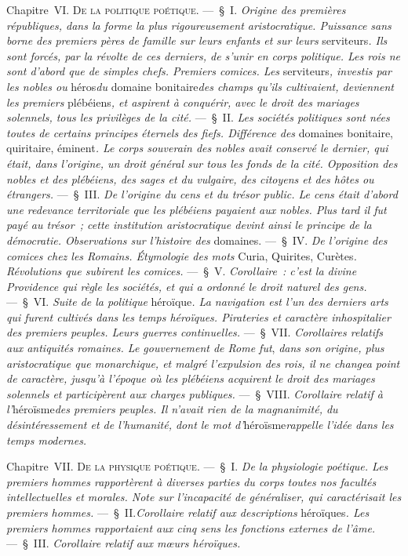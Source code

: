 \documentclass[french,twoside]{book} %
\begin{document}
Chapitre {\scshape VI. De la politique poétique.} — § I. {\itshape Origine des premières républiques, dans la forme la plus rigoureusement aristocratique. Puissance sans borne des premiers pères de famille sur leurs enfants et sur leurs} serviteurs{\itshape . Ils sont forcés, par la révolte de ces derniers, de s’unir en corps}  {\itshape politique. Les rois ne sont d’abord que de simples chefs. Premiers comices. Les} serviteurs{\itshape , investis par les nobles ou} héros{\itshape  du} domaine bonitaire{\itshape  des champs qu’ils cultivaient, deviennent les premiers} plébéiens{\itshape , et aspirent à conquérir, avec le droit des mariages solennels, tous les privilèges de la cité.} — § II. {\itshape Les sociétés politiques sont nées toutes de certains principes éternels des fiefs. Différence des} domaines bonitaire, quiritaire, éminent{\itshape . Le corps souverain des nobles avait conservé le dernier, qui était, dans l’origine, un droit général sur tous les fonds de la cité. Opposition des nobles et des plébéiens, des sages et du vulgaire, des citoyens et des hôtes ou étrangers.} — § III. {\itshape De l’origine du cens et du trésor public. Le cens était d’abord une redevance territoriale que les plébéiens payaient aux nobles. Plus tard il fut payé au trésor ; cette institution aristocratique devint ainsi le principe de la démocratie. Observations sur l’histoire des} domaines. — § IV. {\itshape De l’origine des comices chez les Romains. Étymologie des mots} Curia, Quirites, Curètes{\itshape . Révolutions que subirent les comices.} — § V. {\itshape Corollaire : c’est la divine Providence qui règle les sociétés, et qui a ordonné le droit naturel des gens.} — § VI. {\itshape Suite de la politique} héroïque{\itshape . La navigation est l’un des derniers arts qui furent cultivés dans les temps héroïques. Pirateries et caractère inhospitalier des premiers peuples. Leurs guerres continuelles.} — § VII. {\itshape Corollaires relatifs aux antiquités romaines. Le gouvernement de Rome fut},  {\itshape dans son origine, plus aristocratique que monarchique, et malgré l’expulsion des rois, il ne changea point de caractère, jusqu’à l’époque où les plébéiens acquirent le droit des mariages solennels et participèrent aux charges publiques.} — § VIII. {\itshape Corollaire relatif à l’}héroïsme{\itshape  des premiers peuples. Il n’avait rien de la magnanimité, du désintéressement et de l’humanité, dont le mot d’}héroïsme{\itshape  rappelle l’idée dans les temps modernes.}\par
Chapitre {\scshape VII. De la physique poétique.} — § I. {\itshape De la physiologie poétique. Les premiers hommes rapportèrent à diverses parties du corps toutes nos facultés intellectuelles et morales. Note sur l’incapacité de généraliser, qui caractérisait les premiers hommes.} — § II.{\itshape  Corollaire relatif aux descriptions} héroïques{\itshape . Les premiers hommes rapportaient aux cinq sens les fonctions externes de l’âme.} — § III. {\itshape Corollaire relatif aux mœurs héroïques.}\par
\end{document}
